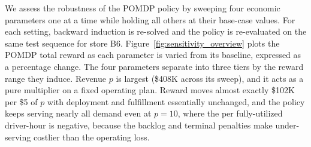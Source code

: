 \documentclass[preprint,11pt,authoryear]{elsarticle}
\newcommand{\bvec}[1]{\mathbf{#1}}
\theoremstyle{remark}
\begin{document}


We assess the robustness of the POMDP policy by sweeping four economic parameters one at a time while holding all others at their base-case values. For each setting, backward induction is re-solved and the policy is re-evaluated on the same test sequence for store B6. Figure~\ref{fig:sensitivity_overview} plots the POMDP total reward as each parameter is varied from its baseline, expressed as a percentage change. The four parameters separate into three tiers by the reward range they induce. Revenue $p$ is largest (\$408K across its sweep), and it acts as a pure multiplier on a fixed operating plan. Reward moves almost exactly \$102K per \$5 of $p$ with deployment and fulfillment essentially unchanged, and the policy keeps serving nearly all demand even at $p = 10$, where the per fully-utilized driver-hour is negative, because the backlog and terminal penalties make under-serving costlier than the operating loss.
\end{document}
